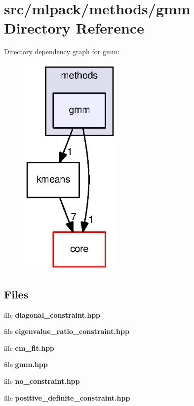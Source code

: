 \section{src/mlpack/methods/gmm Directory Reference}
\label{dir_8736a0c763d9f23987032ed3e2a224d2}
Directory dependency graph for gmm\+:
\nopagebreak
\begin{figure}[H]
\begin{center}
\leavevmode
\includegraphics[width=141pt]{dir_8736a0c763d9f23987032ed3e2a224d2_dep}
\end{center}
\end{figure}
\subsection*{Files}
\begin{DoxyCompactItemize}
\item 
file {\bf diagonal\+\_\+constraint.\+hpp}
\item 
file {\bf eigenvalue\+\_\+ratio\+\_\+constraint.\+hpp}
\item 
file {\bf em\+\_\+fit.\+hpp}
\item 
file {\bf gmm.\+hpp}
\item 
file {\bf no\+\_\+constraint.\+hpp}
\item 
file {\bf positive\+\_\+definite\+\_\+constraint.\+hpp}
\end{DoxyCompactItemize}
